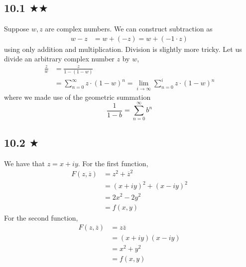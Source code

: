 
\subsection{10.1 $\bigstar\bigstar$}
Suppose $w,z$ are complex numbers. We can construct subtraction as
\begin{align*}
w-z&=w+(-z)=w+(-1\cdot z)
\end{align*}
using only addition and multiplication. Division is slightly more tricky. Let us divide an arbitrary complex number $z$ by $w$,
\begin{align*}
\frac{z}{w}&=\frac{z}{1-(1-w)}\\
&=\sum^{\infty}_{n=0}z\cdot(1-w)^n =\lim_{i\to \infty}\sum^{i}_{n=0}z\cdot(1-w)^n
\end{align*}
where we made use of the geometric summation 
$$\frac{1}{1-b}=\sum^{\infty}_{n=0} b^n$$ 


\subsection{10.2 $\bigstar$}
We have that $z=x+iy$. For the first function,
\begin{align*}
F(z,\overline{z})&=z^2+\overline{z}^2\\
&=(x+iy)^2+(x-iy)^2\\
&=2x^2-2y^2\\
&=f(x,y)
\end{align*}
For the second function,
\begin{align*}
F(z,\overline{z})&=z\overline{z}\\
&=(x+iy)(x-iy)\\
&=x^2+y^2\\
&=f(x,y)
\end{align*}



